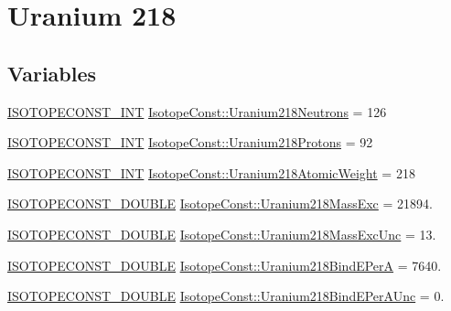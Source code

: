 \hypertarget{group___isotope_const-_uranium-_u218}{}\section{Uranium 218}
\label{group___isotope_const-_uranium-_u218}
\subsection*{Variables}
\begin{DoxyCompactItemize}
\item 
\mbox{\hyperlink{group___isotope_const-_macros_ga5f18360b3e99483a35c32d789e62621c}{I\+S\+O\+T\+O\+P\+E\+C\+O\+N\+S\+T\+\_\+\+I\+NT}} \mbox{\hyperlink{group___isotope_const-_uranium-_u218_ga6d4c02350fec00dac381c9fa12f9cfb4}{Isotope\+Const\+::\+Uranium218\+Neutrons}} = 126
\item 
\mbox{\hyperlink{group___isotope_const-_macros_ga5f18360b3e99483a35c32d789e62621c}{I\+S\+O\+T\+O\+P\+E\+C\+O\+N\+S\+T\+\_\+\+I\+NT}} \mbox{\hyperlink{group___isotope_const-_uranium-_u218_ga6a969123a6e2d6ffa60d408ea2b864c7}{Isotope\+Const\+::\+Uranium218\+Protons}} = 92
\item 
\mbox{\hyperlink{group___isotope_const-_macros_ga5f18360b3e99483a35c32d789e62621c}{I\+S\+O\+T\+O\+P\+E\+C\+O\+N\+S\+T\+\_\+\+I\+NT}} \mbox{\hyperlink{group___isotope_const-_uranium-_u218_ga51e29b9a444b271e1c14b1cfb5226c82}{Isotope\+Const\+::\+Uranium218\+Atomic\+Weight}} = 218
\item 
\mbox{\hyperlink{group___isotope_const-_macros_ga8f45a7272ce02c0b4c65c44636ed719a}{I\+S\+O\+T\+O\+P\+E\+C\+O\+N\+S\+T\+\_\+\+D\+O\+U\+B\+LE}} \mbox{\hyperlink{group___isotope_const-_uranium-_u218_gae99781c80399620450db2ab08f41fa27}{Isotope\+Const\+::\+Uranium218\+Mass\+Exc}} = 21894.
\item 
\mbox{\hyperlink{group___isotope_const-_macros_ga8f45a7272ce02c0b4c65c44636ed719a}{I\+S\+O\+T\+O\+P\+E\+C\+O\+N\+S\+T\+\_\+\+D\+O\+U\+B\+LE}} \mbox{\hyperlink{group___isotope_const-_uranium-_u218_ga62bb86fedd813e6c1f64a3d2b3c48978}{Isotope\+Const\+::\+Uranium218\+Mass\+Exc\+Unc}} = 13.
\item 
\mbox{\hyperlink{group___isotope_const-_macros_ga8f45a7272ce02c0b4c65c44636ed719a}{I\+S\+O\+T\+O\+P\+E\+C\+O\+N\+S\+T\+\_\+\+D\+O\+U\+B\+LE}} \mbox{\hyperlink{group___isotope_const-_uranium-_u218_ga05265651482e288475118415ef027db7}{Isotope\+Const\+::\+Uranium218\+Bind\+E\+PerA}} = 7640.
\item 
\mbox{\hyperlink{group___isotope_const-_macros_ga8f45a7272ce02c0b4c65c44636ed719a}{I\+S\+O\+T\+O\+P\+E\+C\+O\+N\+S\+T\+\_\+\+D\+O\+U\+B\+LE}} \mbox{\hyperlink{group___isotope_const-_uranium-_u218_ga9187a66508facd6ed31e09a7154e7c98}{Isotope\+Const\+::\+Uranium218\+Bind\+E\+Per\+A\+Unc}} = 0.

\end{DoxyCompactItemize}
